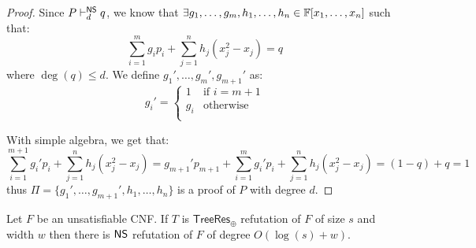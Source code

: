 \begin{proof}
    
 Since $P \vdash^{\mathsf{NS}}_d q$, we know that $\exists g_1, \ldots, g_m, h_1, \ldots, h_n \in \mathbb{F}[x_1, \ldots, x_n]$ such that:
    \[\sum_{i = 1}^m g_i p_i + \sum_{j = 1}^n h_j (x_j^2-x_j) = q\]
 where $\deg(q) \leq d$. We define $g_1', \ldots, g_m', g_{m+1}'$ as:
    \[g_i' = \left \{ \begin{array}{ll}
        1 & \text{if } i = m+1 \\
 g_i & \text{otherwise}  \\
    \end{array}\right .\]
    
\noindent
 With simple algebra, we get that:
    \[\sum_{i = 1}^{m+1} g_i' p_i + \sum_{j = 1}^n h_j (x_j^2-x_j) = g_{m+1}'p_{m+1} + \sum_{i = 1}^{m} g_i' p_i + \sum_{j = 1}^n h_j (x_j^2-x_j) = (1-q) + q = 1\]
 thus $\Pi = \{g_1', \ldots, g_{m+1}', h_1, \ldots, h_n\}$ is a proof of $P$ with degree $d$.

\end{proof}

\begin{theorem}
    \label{main_thm}
 Let $F$ be an unsatisfiable CNF. If $T$ is $\mathsf{TreeRes}_\oplus$ refutation of $F$ of size $s$ and width $w$ then there is $\mathsf{NS}$ refutation of $F$ of degree $O(\log(s)+w)$.
\end{theorem}

